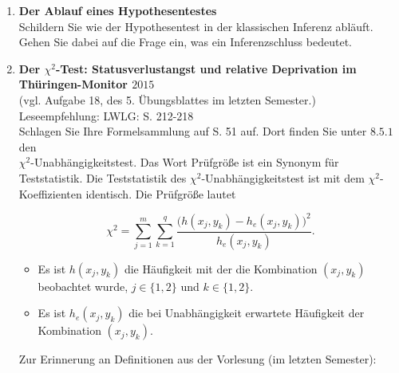 \documentclass[11pt]{article}
\newcommand{\startwert}{3}
\newcommand{\aufgabe}[1]{\item{\bf #1}}
\begin{document}
\begin{enumerate}\addtocounter{enumi}{\startwert}


\aufgabe{Der Ablauf eines Hypothesentestes}\\
Schildern Sie wie der Hypothesentest in der klassischen Inferenz abläuft. Gehen Sie dabei auf die Frage ein, was ein Inferenzschluss bedeutet. %


\aufgabe{Der $\chi^{2}$-Test:  Statusverlustangst und relative Deprivation im Thüringen-Monitor $2015$}\\
(vgl. Aufgabe 18, des 5. Übungsblattes im letzten Semester.)\\
Leseempfehlung: LWLG: S. 212-218\\

Schlagen Sie Ihre Formelsammlung auf S. 51 auf. Dort finden Sie unter $8.5.1$ den \\
$\chi^{2}$-Unabhängigkeitstest. Das Wort Prüfgröße ist ein Synonym für Teststatistik.
Die Teststatistik des $\chi^{2}$-Unabhängigkeitstest ist mit dem $\chi^{2}$-Koeffizienten
identisch.
Die Prüfgröße lautet

$$
\chi^{2}= \sum_{j=1}^{m} 
\sum_{k=1}^{q} \frac{\big(h(x_{j},y_{k})-h_{e}(x_{j},y_{k})\big)^2}{h_{e}(x_{j},y_{k})}.
$$

\begin{itemize}
\item{Es ist $h(x_{j},y_{k})$ die Häufigkeit mit der die Kombination $(x_{j},y_{k})$
beobachtet wurde, $j \in \{1, 2\}$ und $k \in \{1, 2\}.$}
\item{Es ist $h_{e}(x_{j},y_{k})$ die bei Unabhängigkeit erwartete Häufigkeit 
der  Kombination $(x_{j},y_{k}).$}
\end{itemize}
 	


\vspace{0.5cm}
Zur Erinnerung an Definitionen aus  der Vorlesung (im letzten Semester):


\end{enumerate}
\end{document}
